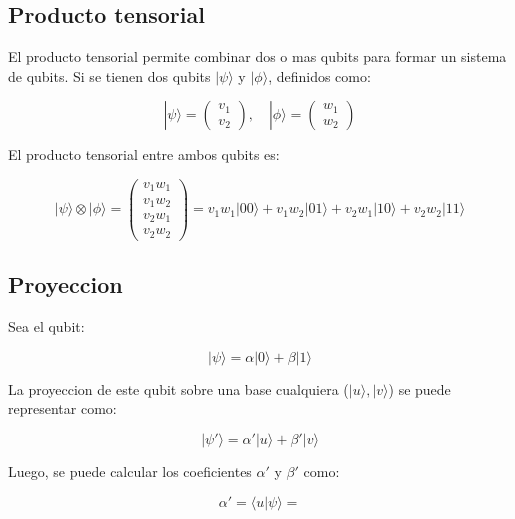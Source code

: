 \documentclass[11pt]{article}
\begin{document}
\subsection{Producto tensorial}

El producto tensorial permite combinar dos o mas qubits para formar un sistema de qubits. Si se tienen dos qubits $|\psi\rangle$ y $|\phi\rangle$, definidos como:

\begin{equation}
    |\psi\rangle = \begin{pmatrix} v_1 \\ v_2 \end{pmatrix}, \quad |\phi\rangle = \begin{pmatrix} w_1 \\ w_2 \end{pmatrix}
\end{equation}

El producto tensorial entre ambos qubits es:

\begin{equation}
    |\psi\rangle \otimes |\phi\rangle = \begin{pmatrix} v_1 w_1 \\ v_1 w_2 \\ v_2 w_1 \\ v_2 w_2 \end{pmatrix} = v_1 w_1 |00\rangle + v_1 w_2 |01\rangle + v_2 w_1 |10\rangle + v_2 w_2 |11\rangle
\end{equation}

\subsection{Proyeccion}

Sea el qubit:

\begin{equation}
    |\psi\rangle = \alpha |0\rangle + \beta |1\rangle 
\end{equation}

La proyeccion de este qubit sobre una base cualquiera ($|u\rangle, |v\rangle$) se puede representar como:

\begin{equation}
    |\psi '\rangle = \alpha ' |u\rangle + \beta ' |v\rangle
\end{equation}

Luego, se puede calcular los coeficientes $\alpha '$ y $\beta '$ como:

\begin{equation}
    \alpha ' = \langle u | \psi \rangle = 
\end{equation}
\end{document}
